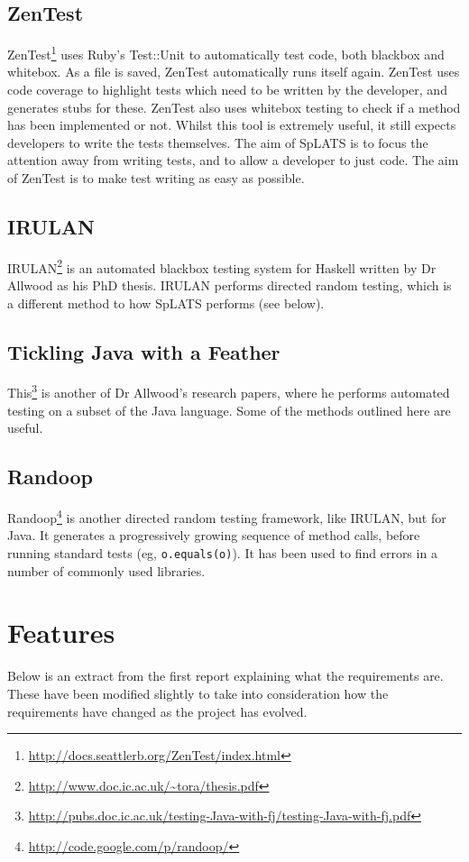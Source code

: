   \subsection{ZenTest}
    ZenTest\footnote{\url{http://docs.seattlerb.org/ZenTest/index.html}} uses Ruby's Test::Unit to automatically test code, both blackbox and whitebox.
    As a file is saved, ZenTest automatically runs itself again.
    ZenTest uses code coverage to highlight tests which need to be written by the developer, and generates stubs for these.
    ZenTest also uses whitebox testing to check if a method has been implemented or not.
    Whilst this tool is extremely useful, it still expects developers to write the tests themselves.
    The aim of SpLATS is to focus the attention away from writing tests, and to allow a developer to just code.
    The aim of ZenTest is to make test writing as easy as possible.

  \subsection{IRULAN}
    IRULAN\footnote{\url{http://www.doc.ic.ac.uk/~tora/thesis.pdf}} is an automated blackbox testing system for Haskell written by Dr Allwood as his PhD thesis.
    IRULAN performs directed random testing, which is a different method to how SpLATS performs (see below).

  \subsection{Tickling Java with a Feather}
    This\footnote{\url{http://pubs.doc.ic.ac.uk/testing-Java-with-fj/testing-Java-with-fj.pdf}} is another of Dr Allwood's research papers, where he performs automated testing on a subset of the Java language.
    Some of the methods outlined here are useful.

  \subsection{Randoop}
    Randoop\footnote{\url{http://code.google.com/p/randoop/}} is another directed random testing framework, like IRULAN, but for Java.
    It generates a progressively growing sequence of method calls, before running standard tests (eg, \verb|o.equals(o)|).
    It has been used to find errors in a number of commonly used libraries.

\def \colwidth {0.35\textwidth}
\section{Features}
  Below is an extract from the first report explaining what the requirements are.
  These have been modified slightly to take into consideration how the requirements have changed as the project has evolved.
